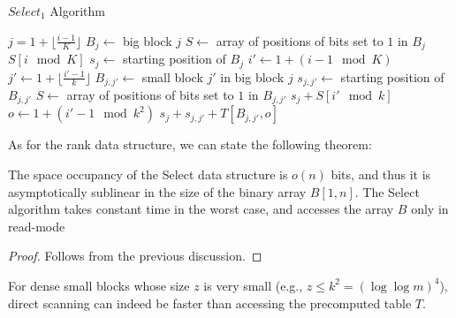 \begin{algorithm}[hbtp]
    \caption{$Select_1$ Algorithm} \label{alg:select}
    \begin{algorithmic}
        \State $ j = 1 + \lfloor \frac{i-1}{K} \rfloor$ 
        \State $B_{j} \gets$ big block $j$
        \State $S \gets$ array of positions of bits set to $1$ in $B_{j}$
        \State \Return $S[i \mod K]$
        \Else
        \State $s_j \gets$ starting position of $B_{j}$
        \State $i' \gets 1 + (i-1 \mod K)$ 
        \State $j' \gets 1 + \lfloor \frac{i'-1}{k} \rfloor$ 
        \State $B_{j,j'} \gets$ small block $j'$ in big block $j$
        \State $s_{j,j'} \gets$ starting position of $B_{j,j'}$
        \State $S \gets$ array of positions of bits set to $1$ in $B_{j,j'}$
        \State \Return $s_j + S[i' \mod k]$
        \Else
        \State $o \gets 1 + (i'-1 \mod k^2)$ 
        \State \Return $s_j + s_{j,j'} + T[B_{j,j'}, o]$
        \EndIf
        \EndIf
        \EndFunction
    \end{algorithmic}
\end{algorithm}

As for the rank data structure, we can state the following theorem:

\begin{theorem} \label{th:select}
    The space occupancy of the Select data structure is $o(n)$ bits, and thus it is asymptotically sublinear in the size of the binary array $B[1, n]$. The Select algorithm takes constant time in the worst case, and accesses the array $B$ only in read-mode
\end{theorem}
\begin{proof}
    Follows from the previous discussion.
\end{proof}
For dense small blocks whose size $z$ is very small (e.g., $z \le k^2 = (\log \log m)^4$), direct scanning can indeed be faster than accessing the precomputed table $T$.


